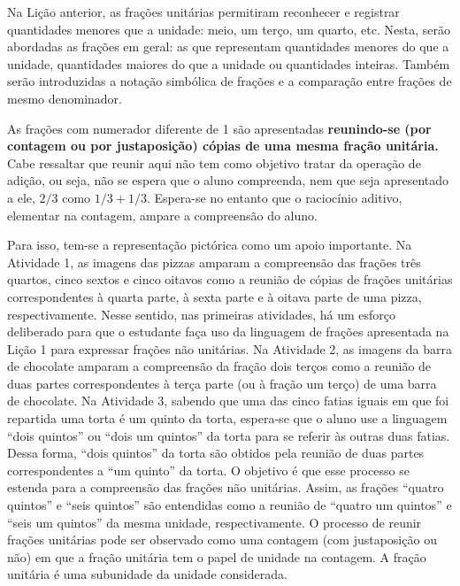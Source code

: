 
\noindent {\color{special}{\Large \bf LIÇÃO 2 - Para o professor}}
\vspace{.5cm}

Na Lição anterior, as frações unitárias permitiram reconhecer e registrar quantidades menores que a unidade: meio, um terço, um quarto, etc. Nesta, serão abordadas as frações em geral: as que representam quantidades menores do que a unidade, quantidades maiores do que a unidade ou quantidades inteiras. Também serão introduzidas a notação simbólica de frações e a comparação entre frações de mesmo denominador. 

As frações com numerador diferente de 1 são apresentadas \textbf{reunindo-se (por contagem ou por justaposição) cópias de uma mesma fração unitária.}
Cabe ressaltar que reunir aqui não tem como objetivo tratar da operação de adição, ou seja, não se espera que o aluno compreenda, nem que seja apresentado a ele, $2/3$ como $1/3 + 1/3$. Espera-se no entanto que o raciocínio aditivo, elementar na contagem, ampare a compreensão do aluno.

Para isso, tem-se a representação pictórica como um apoio importante.
Na Atividade 1, as imagens das pizzas amparam a compreensão das frações três quartos, cinco sextos e cinco oitavos como a reunião de cópias de frações unitárias correspondentes à quarta parte, à sexta parte e à oitava parte de uma pizza, respectivamente. Nesse sentido, nas primeiras atividades, há um esforço deliberado para que o estudante faça uso da linguagem de frações apresentada na Lição 1 para expressar frações não unitárias.
Na Atividade 2, as imagens da barra de chocolate amparam a compreensão da fração dois terços como a reunião de duas partes correspondentes à terça parte (ou à fração um terço) de uma barra de chocolate.
Na Atividade 3, sabendo que uma das cinco fatias iguais em que foi repartida uma torta é um quinto da torta, espera-se que o aluno use a linguagem ``dois quintos'' ou ``dois um quintos'' da torta para se referir às outras duas fatias.
Dessa forma, ``dois quintos'' da torta são obtidos pela reunião de duas partes correspondentes a ``um quinto'' da torta.
O objetivo é que esse processo se estenda para a compreensão das frações não unitárias.
Assim, as frações ``quatro quintos'' e ``seis quintos'' são entendidas como a reunião de ``quatro um quintos'' e ``seis um quintos'' da mesma unidade, respectivamente. O processo de reunir frações unitárias pode ser observado como uma contagem (com justaposição ou não) em que a fração unitária tem o papel de unidade na contagem. A fração unitária é uma subunidade da unidade considerada. 

